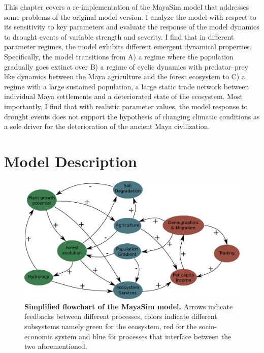 This chapter covers a re-implementation of the MayaSim model that addresses some problems of the original model version. I analyze the model with respect to its sensitivity to key parameters and evaluate the response of the model dynamics to drought events of variable strength and severity. I find that in different parameter regimes, the model exhibits different emergent dynamical properties. Specifically, the model transitions from A) a regime where the population gradually goes extinct over B) a regime of cyclic dynamics with predator--prey like dynamics between the Maya agriculture and the forest ecosystem to C) a regime with a large sustained population, a large static trade network between individual Maya settlements and a deteriorated state of the ecosystem. Most importantly, I find that with realistic parameter values, the model response to drought events does not support the hypothesis of changing climatic conditions as a sole driver for the deterioration of the ancient Maya civilization.

\section{Model Description}


\begin{figure}
    \centering
    \includegraphics[width=.9 \textwidth]{figures/model_flowchart.pdf}
    \caption[Flowchart of the MayaSim model]{\textbf{Simplified flowchart of the MayaSim model.} Arrows indicate feedbacks between different processes, colors indicate different subsystems namely green for the ecosystem, red for the socio-economic system and blue for processes that interface between the two aforementioned.}
    \label{fig:my_label}
\end{figure}

